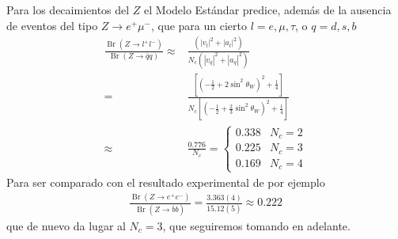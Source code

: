 Para los decaimientos del $Z$ el Modelo Estándar predice, además de la ausencia de eventos del tipo $Z\to e^+\mu^-$, que para un cierto  $l=e,\mu,\tau$, o  $q=d,s,b$
\begin{align}
  \frac{ \operatorname{Br}(Z\to l^+l^-)}{ \operatorname{Br}(Z\to\bar{q}q)}\approx&
\frac{(|v_l|^2+|a_l|^2)}{N_c(|v_q|^2+|a_q|^2)}\nonumber\\
=&\frac{\left[\left(-\frac{1}{2}+2\sin^2\theta_W\right)^2+\frac{1}{4}\right]}{
N_c\left[\left(-\frac{1}{2}+\frac{2}{3}\sin^2\theta_W\right)^2+\frac{1}{4}\right]}\nonumber\\
\approx&\frac{0.776}{N_c}=
\begin{cases}
  0.338& N_c=2\\
  0.225& N_c=3\\
  0.169& N_c=4
\end{cases}
\end{align}
Para ser comparado con el resultado experimental de por ejemplo
\begin{align}
  \frac{ \operatorname{Br}(Z\to e^+e^-)}{ \operatorname{Br}(Z\to\bar{b}b)}=\frac{3.363(4)}{15.12(5)}\approx0.222
\end{align}
que de nuevo da lugar al $N_c=3$, que seguiremos tomando en adelante.

